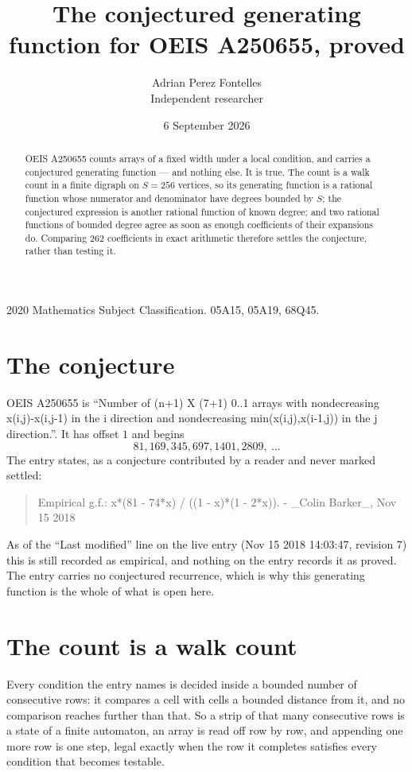 \documentclass[11pt,a4paper]{article}
\title{The conjectured generating function for OEIS A250655, proved}
\author{Adrian Perez Fontelles\\ \small Independent researcher}
\date{6 September 2026}
\theoremstyle{plain}
\theoremstyle{definition}
\begin{document}
\maketitle

\begin{abstract}
OEIS A250655 counts arrays of a fixed width under a local condition, and carries a conjectured
generating function --- and nothing else. It is true. The count is a walk count in a finite
digraph on $S=256$ vertices, so its generating function is a rational function whose numerator
and denominator have degrees bounded by $S$; the conjectured expression is another rational
function of known degree; and two rational functions of bounded degree agree as soon as enough
coefficients of their expansions do. Comparing $262$ coefficients in exact arithmetic
therefore settles the conjecture, rather than testing it.
\end{abstract}

\noindent\small 2020 Mathematics Subject Classification. 05A15, 05A19, 68Q45.\normalsize

\section{The conjecture}

OEIS A250655 is ``Number of (n+1) X (7+1) 0..1 arrays with nondecreasing x(i,j)-x(i,j-1) in the i direction and nondecreasing min(x(i,j),x(i-1,j)) in the j direction.''. It has offset $1$ and begins
\[
81, 169, 345, 697, 1401, 2809,\ \dots
\]
The entry states, as a conjecture contributed by a reader and never marked settled:
\begin{quote}
Empirical g.f.: x*(81 - 74*x) / ((1 - x)*(1 - 2*x)). - \_Colin Barker\_, Nov 15 2018
\end{quote}
As of the ``Last modified'' line on the live entry (Nov 15 2018 14:03:47, revision 7) this is still
recorded as empirical, and nothing on the entry records it as proved. The entry carries no
conjectured recurrence, which is why this generating function is the whole of what is open
here.

\section{The count is a walk count}

Every condition the entry names is decided inside a bounded number of consecutive rows: it
compares a cell with cells a bounded distance from it, and no comparison reaches further than
that. So a strip of that many consecutive rows is a state of a finite automaton, an array is
read off row by row, and appending one more row is one step, legal exactly when the row it
completes satisfies every condition that becomes testable.
\end{document}
